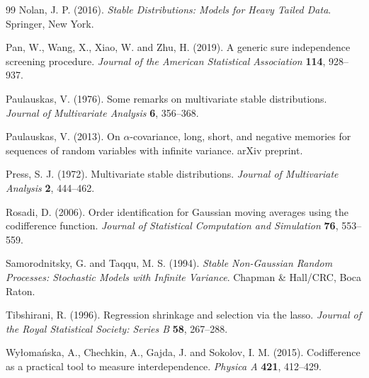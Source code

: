 \documentclass[11pt]{article}
\theoremstyle{definition}
\begin{document}
\begin{thebibliography}{99}
Nolan, J. P. (2016). \emph{Stable Distributions: Models for Heavy Tailed Data}. Springer, New York.

Pan, W., Wang, X., Xiao, W. and Zhu, H. (2019). A generic sure independence screening procedure. \emph{Journal of the American Statistical Association} \textbf{114}, 928--937.

Paulauskas, V. (1976). Some remarks on multivariate stable distributions. \emph{Journal of Multivariate Analysis} \textbf{6}, 356--368.

Paulauskas, V. (2013). On \(\alpha\)-covariance, long, short, and negative memories for sequences of random variables with infinite variance. arXiv preprint.

Press, S. J. (1972). Multivariate stable distributions. \emph{Journal of Multivariate Analysis} \textbf{2}, 444--462.

Rosadi, D. (2006). Order identification for Gaussian moving averages using the codifference function. \emph{Journal of Statistical Computation and Simulation} \textbf{76}, 553--559.

Samorodnitsky, G. and Taqqu, M. S. (1994). \emph{Stable Non-Gaussian Random Processes: Stochastic Models with Infinite Variance}. Chapman \& Hall/CRC, Boca Raton.

Tibshirani, R. (1996). Regression shrinkage and selection via the lasso. \emph{Journal of the Royal Statistical Society: Series B} \textbf{58}, 267--288.

Wy\l oma\'nska, A., Chechkin, A., Gajda, J. and Sokolov, I. M. (2015). Codifference as a practical tool to measure interdependence. \emph{Physica A} \textbf{421}, 412--429.
\end{thebibliography}
\end{document}
